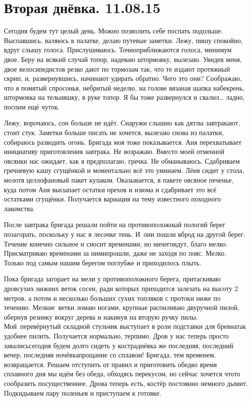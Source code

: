 \chapter{Вторая днёвка. 11.08.15}

Сегодня будем тут целый день. Можно позволить себе поспать подольше. Выспавшись, валяюсь в палатке, делаю путевые заметки. Лежу, пишу спокойно, вдруг слышу голоса. Прислушиваюсь. Точно\mdash приближаются голоса, минимум двое. Беру на всякий случай топор, надеваю штормовку, вылезаю. Увидев меня, двое велосипедистов резко дают по тормозам так, что те издают протяжный скрип, и, развернувшись, начинают удирать обратно. Чего это они? Соображаю, что я помятый спросонья, небритый неделю, на голове вязаная шапка набекрень, штормовка на тельняшку, в руке топор. Я бы тоже развернулся и свалил… ладно, поспим ещё чуток. 

Лежу, ворочаюсь, сон больше не идёт. Снаружи слышно как дятлы завтракают, стоит стук. Заметки больше писать не хочется, вылезаю снова из палатки, собираюсь разводить огонь. Бригада моя тоже показывается. Аня перехватывает инициативу приготовления завтрака. Не возражаю. Вместо моей отменной овсянки нас ожидает, как я предполагаю, гречка. Не обманываюсь. Сдабриваем гречневую кашу сгущёнкой и моментально всё это уминаем. Лёня сидит у стола, молотя целлофановый пакет кулаком. Оказывается, в пакете овсяное печенье, куда потом Аня высыпает остатки орехов и изюма и сдабривает это всё остатками сгущёнки. Получается вариация на тему известного походного лакомства.

После завтрака бригада решали пойти на противоположный пологий берег позагорать, поскольку у нас в лесочке тень. И~они пошли вброд на другой берег. Течение конечно сильное и сносит временами, но ничего\mdash идут, благо мелко. Присматриваю временами за ними\mdash прошли, даже не заходя по пояс. Мелко. Только под самым нашим берегом поглубже и приходилось плыть. 

Пока бригада загорает на мели у противоположного берега, притаскиваю дров\mdash сухих нижних веток сосен, ради которых приходится залезать на высоту 2 метров, а потом и несколько больших сухих топляков с протоки ниже по течению. Мелкие~ветки ломаю ногами, крупные распиливаю двуручной пилой, обернув резинку вокруг дерева и накинув на вторую ручку пилы. Мой~перевёрнутый складной стульчик выступает в роли подставки для бревна\mdash так удобнее пилить. Получается нормально, терпимо. Дров у нас теперь просто завались\mdash сегодня будем долго сидеть у костра\mdash днёвка же последняя, последний вечер, последняя ночёвка\mdash прощание со сплавом! Бригада, тем временем, возвращается. Решаем отступить от правил и приготовить обед\mdash во время сплавного дня мы идём без обеда, обходясь перекусом, но сейчас хочется что\sdash то сообразить посущественнее. Дрова теперь есть, костёр постоянно немного дымит. Подкидываем пару поленьев и приступаем к готовке.

